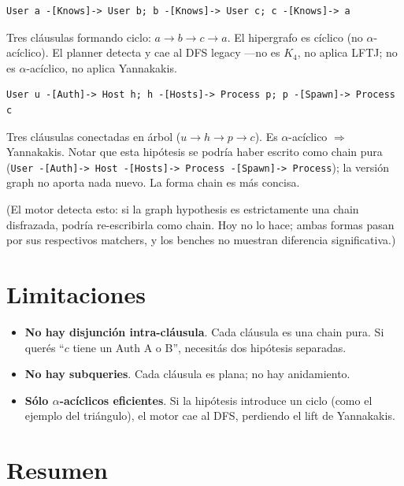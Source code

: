 \begin{ejemplo}
\begin{lstlisting}
User a -[Knows]-> User b; b -[Knows]-> User c; c -[Knows]-> a
\end{lstlisting}

Tres cláusulas formando ciclo: \(a \to b \to c \to a\). El
hipergrafo es cíclico (no \(\alpha\)-acíclico). El planner detecta
y cae al DFS legacy ---no es \(K_4\), no aplica LFTJ; no es
\(\alpha\)-acíclico, no aplica Yannakakis.
\end{ejemplo}

\begin{ejemplo}
\begin{lstlisting}
User u -[Auth]-> Host h; h -[Hosts]-> Process p; p -[Spawn]-> Process c
\end{lstlisting}

Tres cláusulas conectadas en árbol (\(u \to h \to p \to c\)). Es
\(\alpha\)-acíclico $\Rightarrow$ Yannakakis. Notar que esta
hipótesis se podría haber escrito como chain pura
(\texttt{User -[Auth]-> Host -[Hosts]-> Process -[Spawn]-> Process});
la versión graph no aporta nada nuevo. La forma chain es más
concisa.

(El motor detecta esto: si la graph hypothesis es estrictamente
una chain disfrazada, podría re-escribirla como chain. Hoy no lo
hace; ambas formas pasan por sus respectivos matchers, y los
benches no muestran diferencia significativa.)
\end{ejemplo}

\section{Limitaciones}

\begin{itemize}
    \item \textbf{No hay disjunción intra-cláusula}. Cada cláusula
    es una chain pura. Si querés ``\(c\) tiene un Auth A o B'',
    necesitás dos hipótesis separadas.
    \item \textbf{No hay subqueries}. Cada cláusula es plana; no
    hay anidamiento.
    \item \textbf{Sólo \(\alpha\)-acíclicos eficientes}. Si la
    hipótesis introduce un ciclo (como el ejemplo del triángulo),
    el motor cae al DFS, perdiendo el lift de Yannakakis.
\end{itemize}

\section{Resumen}

